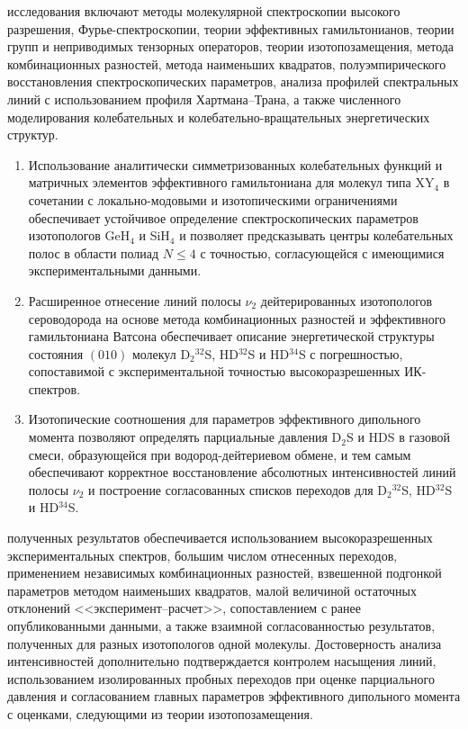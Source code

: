 {\methods} исследования включают методы молекулярной спектроскопии высокого разрешения,
Фурье-спектроскопии, теории эффективных гамильтонианов, теории групп и неприводимых тензорных
операторов, теории изотопозамещения, метода комбинационных разностей, метода наименьших квадратов,
полуэмпирического восстановления спектроскопических параметров, анализа профилей спектральных линий
с использованием профиля Хартмана--Трана, а также численного моделирования колебательных и
колебательно-вращательных энергетических структур.

{}
\begin{enumerate}[beginpenalty=10000]
  \item Использование аналитически симметризованных колебательных функций и матричных элементов
  эффективного гамильтониана для молекул типа XY$_4$ в сочетании с локально-модовыми и изотопическими
  ограничениями обеспечивает устойчивое определение спектроскопических параметров изотопологов GeH$_4$
  и SiH$_4$ и позволяет предсказывать центры колебательных полос в области полиад $N\leq4$ с точностью,
  согласующейся с имеющимися экспериментальными данными.
  \item Расширенное отнесение линий полосы $\nu_2$ дейтерированных изотопологов сероводорода на основе
  метода комбинационных разностей и эффективного гамильтониана Ватсона обеспечивает описание
  энергетической структуры состояния $(010)$ молекул D$_2{}^{32}$S, HD$^{32}$S и HD$^{34}$S с
  погрешностью, сопоставимой с экспериментальной точностью высокоразрешенных ИК-спектров.
  \item Изотопические соотношения для параметров эффективного дипольного момента позволяют определять
  парциальные давления D$_2$S и HDS в газовой смеси, образующейся при водород-дейтериевом обмене, и тем
  самым обеспечивают корректное восстановление абсолютных интенсивностей линий полосы $\nu_2$ и
  построение согласованных списков переходов для D$_2{}^{32}$S, HD$^{32}$S и HD$^{34}$S.
\end{enumerate}

{\reliability} полученных результатов обеспечивается использованием высокоразрешенных экспериментальных
спектров, большим числом отнесенных переходов, применением независимых комбинационных разностей,
взвешенной подгонкой параметров методом наименьших квадратов, малой величиной остаточных отклонений
<<эксперимент--расчет>>, сопоставлением с ранее опубликованными данными, а также взаимной
согласованностью результатов, полученных для разных изотопологов одной молекулы. Достоверность анализа
интенсивностей дополнительно подтверждается контролем насыщения линий, использованием изолированных
пробных переходов при оценке парциального давления и согласованием главных параметров эффективного
дипольного момента с оценками, следующими из теории изотопозамещения.

